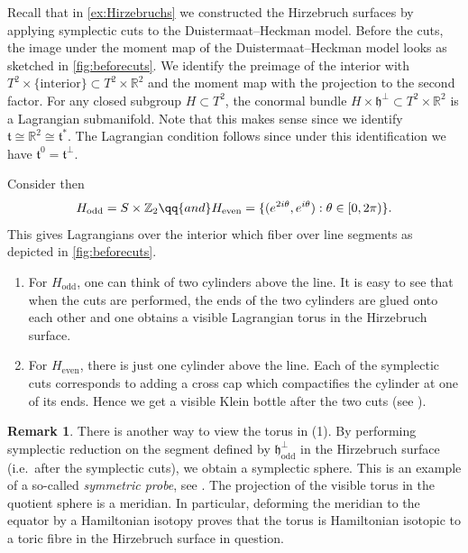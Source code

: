 \documentclass[10pt,oneside,reqno]{amsart}
\theoremstyle{definition}
\newtheorem*{remark}{Remark}
\newcommand{\ft}{\mathfrak{t}}
\newcommand{\IR}{\mathbb{R}}
\newcommand{\IZ}{\mathbb{Z}}
\begin{document}
Recall that in \cref{ex:Hirzebruchs} we constructed the Hirzebruch surfaces by applying symplectic cuts to the Duistermaat--Heckman model. Before the cuts, the image under the moment map of the Duistermaat--Heckman model looks as sketched in \cref{fig:beforecuts}. We identify the preimage of the interior with $T^2 \times \{\text{interior}\}\subset T^2\times \IR^2$ and the moment map with the projection to the second factor. For any closed subgroup $H\subset T^2$, the conormal bundle $H\times \mathfrak{h}^\perp \subset T^2\times \IR^2$ is a Lagrangian submanifold. Note that this makes sense since we identify $\ft \cong \IR^2 \cong \ft^*$. The Lagrangian condition follows since under this identification we have $\ft^0 = \ft^\perp$. 

Consider then $$H_\text{odd}=S\times \IZ_2\qq{and}H_\text{even}=\{(e^{2i\theta},e^{i\theta}):\theta\in [0,2\pi)\}.$$ This gives Lagrangians over the interior which fiber over line segments as depicted in \cref{fig:beforecuts}. 

\begin{enumerate}
    \item For $H_\text{odd}$, one can think of two cylinders above the line.  It is easy to see that when the cuts are performed, the ends of the two cylinders are glued onto each other and one obtains a visible Lagrangian torus in the Hirzebruch surface. 
    \item For $H_\text{even}$, there is just one cylinder above the line. Each of the symplectic cuts corresponds to adding a cross cap which compactifies the cylinder at one of its ends. Hence we get a visible Klein bottle after the two cuts (see \cite[Exercise 5.16]{evans2023lectures}). 
\end{enumerate}

\begin{remark}
    There is another way to view the torus in (1). By performing symplectic reduction on the segment defined by $\mathfrak{h}_\text{odd}^\perp$ in the Hirzebruch surface (i.e.\ after the symplectic cuts), we obtain a symplectic sphere. This is an example of a so-called \emph{symmetric probe}, see \cite{McD11,AbrBorMcD14}. The projection of the visible torus in the quotient sphere is a meridian. In particular, deforming the meridian to the equator by a Hamiltonian isotopy proves that the torus is Hamiltonian isotopic to a toric fibre in the Hirzebruch surface in question.
\end{remark}
\end{document}

